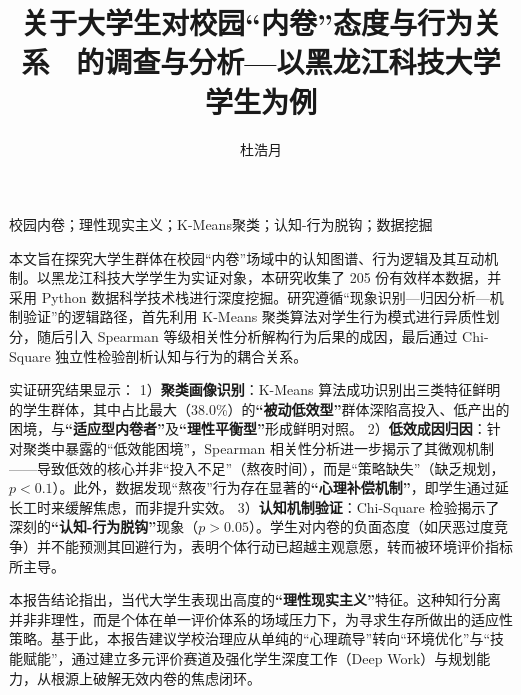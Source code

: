 \documentclass[win,thesis]{hustreport} %
\author{杜浩月}
\title{关于大学生对校园“内卷”态度与行为关系 \ 的调查与分析---以黑龙江科技大学学生为例}
\begin{document}
	
	\cfoot{\thepage}
	
	\makecover
	
	\maketaskbook
	
\begin{cnabstract}{校园内卷；理性现实主义；K-Means聚类；认知-行为脱钩；数据挖掘}
	
	本文旨在探究大学生群体在校园“内卷”场域中的认知图谱、行为逻辑及其互动机制。以黑龙江科技大学学生为实证对象，本研究收集了 205 份有效样本数据，并采用 Python 数据科学技术栈进行深度挖掘。研究遵循“现象识别—归因分析—机制验证”的逻辑路径，首先利用 K-Means 聚类算法对学生行为模式进行异质性划分，随后引入 Spearman 等级相关性分析解构行为后果的成因，最后通过 Chi-Square 独立性检验剖析认知与行为的耦合关系。
	
	实证研究结果显示：
	1）\textbf{聚类画像识别}：K-Means 算法成功识别出三类特征鲜明的学生群体，其中占比最大（38.0\%）的\textbf{“被动低效型”}群体深陷高投入、低产出的困境，与\textbf{“适应型内卷者”}及\textbf{“理性平衡型”}形成鲜明对照。
	2）\textbf{低效成因归因}：针对聚类中暴露的“低效能困境”，Spearman 相关性分析进一步揭示了其微观机制——导致低效的核心并非“投入不足”（熬夜时间），而是“策略缺失”（缺乏规划，$p<0.1$）。此外，数据发现“熬夜”行为存在显著的\textbf{“心理补偿机制”}，即学生通过延长工时来缓解焦虑，而非提升实效。
	3）\textbf{认知机制验证}：Chi-Square 检验揭示了深刻的\textbf{“认知-行为脱钩”}现象（$p>0.05$）。学生对内卷的负面态度（如厌恶过度竞争）并不能预测其回避行为，表明个体行动已超越主观意愿，转而被环境评价指标所主导。
	
	本报告结论指出，当代大学生表现出高度的\textbf{“理性现实主义”}特征。这种知行分离并非非理性，而是个体在单一评价体系的场域压力下，为寻求生存所做出的适应性策略。基于此，本报告建议学校治理应从单纯的“心理疏导”转向“环境优化”与“技能赋能”，通过建立多元评价赛道及强化学生深度工作（Deep Work）与规划能力，从根源上破解无效内卷的焦虑闭环。
	
\end{cnabstract}
	
	\tableofcontents
	\newpage
	
	\setcounter{page}{1}
	
	
	
	
\end{document}
